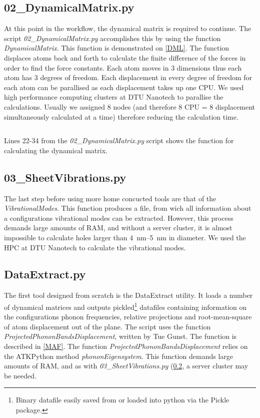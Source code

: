 \subsection{02\_DynamicalMatrix.py}\label{02}
At this point in the workflow, the dynamical matrix is required to continue. The script \textit{02\_DynamicalMatrix.py} accomplishes this by using the function \textit{DynamicalMatrix}. This function is demonstrated on \cref{DML}. The function displaces atoms back and forth to calculate the finite difference of the forces in order to find the force constants. Each atom moves in 3 dimensions thus each atom has 3 degrees of freedom. Each displacement in every degree of freedom for each atom can be parallised as each displacement takes up one CPU. We used high performance computing clusters at DTU Nanotech to parallise the calculations. Usually we assigned 8 nodes (and therefore 8 CPU = 8 displacement simultaneously calculated at a time) therefore reducing the calculation time.
\onecolumngrid

\begin{listing}[H]
 \inputminted[python3=true,bgcolor=Black,linenos=true,firstline=22,lastline=34]{python}{VNL/PythonScripts/Scripts/02_DynamicalMatrix.py}
 \caption{Lines 22-34 from the \textit{02\_DynamicalMatrix.py} script shows the function for calculating the dynamical matrix.}
 \label{DML}
\end{listing}
\twocolumngrid
\subsection{03\_SheetVibrations.py}\label{03}
The last step before using more home concucted tools are that of the \textit{VibrationalModes}. This function produces a file, from wich all information about a configurations vibrational modes can be extracted. However, this process demands large amounts of RAM, and without a server cluster, it is almost impossible to calculate holes larger than \SIrange{4}{5}{\nm} in diameter. We used the HPC at DTU Nanotech to calculate the vibrational modes.
\subsection{DataExtract.py}\label{DE}
The first tool designed from scratch is the DataExtract utility. It loads a number of dynamical matrices and outputs pickled\footnote{Binary datafile easily saved from or loaded into python via the Pickle package.} datafiles containing information on the configurations phonon frequencies, relative projections and root-mean-square of atom displacement out of the plane. The script uses the function \textit{ProjectedPhononBandsDisplacement}, written by Tue Gunst. The function is described in \cref{MAF}.
The function \textit{ProjectedPhononBandsDisplacement} relies on the ATKPython method \textit{phononEigensystem}. This function demands large amounts of RAM, and as with \textit{03\_SheetVibrations.py} (\cref{03}, a server cluster may be needed.
